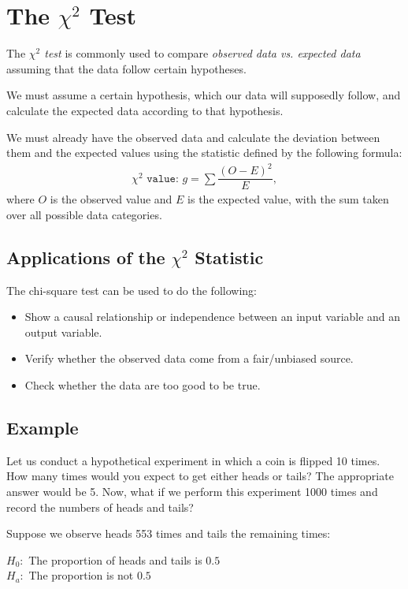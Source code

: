 \section{The $\chi^2$ Test}
\label{sec:3.9}

The \emph{$\chi^2$ test} is commonly used to compare \emph{observed data vs. expected data} assuming that the data follow certain hypotheses.

We must assume a certain hypothesis, which our data will supposedly follow, and calculate the expected data according to that hypothesis.

We must already have the observed data and calculate the deviation between them and the expected values using the statistic defined by the following formula:
\begin{align}
	\texttt{$\chi^2$ value: } g = \sum\dfrac{\left( O-E \right)^{2}}{E},
\end{align}
where $O$ is the observed value and $E$ is the expected value, with the sum taken over all possible data categories.

\subsection{Applications of the $\chi^2$ Statistic}
The chi-square test can be used to do the following:
\begin{itemize}
	\item Show a causal relationship or independence between an input variable and an output variable.  
	\item Verify whether the observed data come from a fair/unbiased source. 
	\item Check whether the data are too good to be true.
\end{itemize}

\subsection{Example}
Let us conduct a hypothetical experiment in which a coin is flipped 10 times. How many times would you expect to get either heads or tails? The appropriate answer would be 5. Now, what if we perform this experiment 1000 times and record the numbers of heads and tails?

Suppose we observe heads 553 times and tails the remaining times:
\begin{center}
	$H_{0}:$ The proportion of heads and tails is $0.5$ \\
	$H_{a}:$ The proportion is not $0.5$
\end{center}


